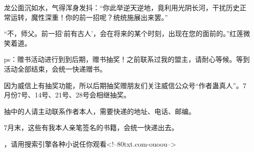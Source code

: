 \begin{this_body}
龙公面沉如水，气得浑身发抖：“你此举逆天逆地，竟利用光阴长河，干扰历史正常运转，魔性深重！你的前一招呢？统统施展出来罢。”

“不，师父。前一招‘前有古人’，会在将来的某个时刻，出现在您的面前的。”红莲微笑着道。

ps：赠书活动进行到到后期，赠书抽奖！之前联系过我的盟主，请耐心等候。等到活动全部结束，会统一快递赠书。

因为威信上有抽奖功能，所以后期抽奖赠朋友们关注威信公众号“作者蛊真人”。7月份7号、14号、21号、28号会相继抽奖。

抽中的人请主动联系作者本人，需要快递的地址、电话、邮编。

7月末，这些有我本人亲笔签名的书籍，会统一快递出去。

，请用搜索引擎各种小说任你观看<!--80txt.com-ouoou-->

\end{this_body}


